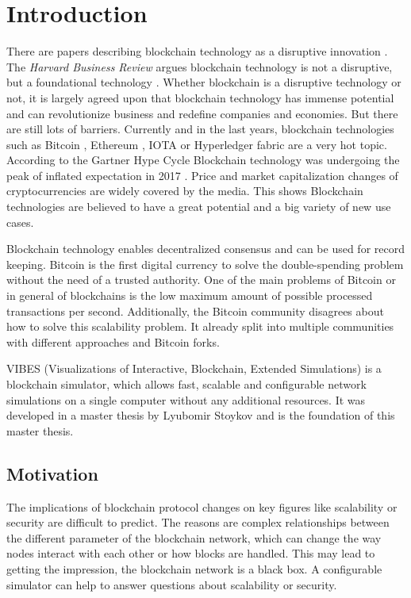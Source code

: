 \chapter{Introduction} 
\label{chapter:introduction}
There are papers describing blockchain technology as a disruptive innovation \cite{atzori2015blockchain}. The \textit{Harvard Business Review} argues blockchain technology is not a disruptive, but a foundational technology \cite{harvardbusinessreview}. Whether blockchain is a disruptive technology or not, it is largely agreed upon that blockchain technology has immense potential and can revolutionize business and redefine companies and economies. But there are still lots of barriers. Currently and in the last years, blockchain technologies such as Bitcoin \cite{nakamoto2012bitcoin}, Ethereum \cite{buterin2014ethereum}, IOTA \cite{Newcomb:2017:ICI:3133850.3133860} or Hyperledger fabric \cite{Androulaki:2018:HFD:3190508.3190538} are a very hot topic. According to the Gartner Hype Cycle Blockchain technology was undergoing the peak of inflated expectation in 2017 \cite{gartner}. Price and market capitalization changes of cryptocurrencies are widely covered by the media. This shows Blockchain technologies are believed to have a great potential and a big variety of new use cases. 

Blockchain technology enables decentralized consensus and can be used for record keeping. Bitcoin is the first digital currency to solve the double-spending problem without the need of a trusted authority. One of the main problems of Bitcoin or in general of blockchains is the low maximum amount of possible processed transactions per second. Additionally, the Bitcoin community disagrees about how to solve this scalability problem. It already split into multiple communities with different approaches and Bitcoin forks.

VIBES (Visualizations of Interactive, Blockchain, Extended Simulations) is a blockchain simulator, which allows fast, scalable and configurable network simulations on a single computer without any additional resources. It was developed in a master thesis by Lyubomir Stoykov \cite{vibes} and is the foundation of this master thesis.

\section{Motivation} 
\label{sec:motivation}
The implications of blockchain protocol changes on key figures like scalability or security are difficult to predict. The reasons are complex relationships between the different parameter of the blockchain network, which can change the way nodes interact with each other or how blocks are handled. This may lead to getting the impression, the blockchain network is a black box. A configurable simulator can help to answer questions about scalability or security.

